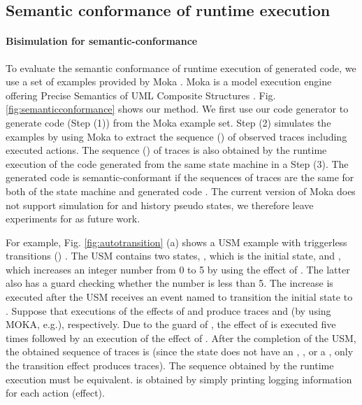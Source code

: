 
\subsection{Semantic conformance of runtime execution}
\label{subsec:exp2}
\paragraph{Bisimulation for semantic-conformance}
To evaluate the semantic conformance of runtime execution of generated code, we use a set of examples provided by Moka \cite{moka}. Moka is a model execution engine offering Precise Semantics of UML Composite Structures \cite{OMG2015}. Fig. \ref{fig:semanticconformance} shows our method. We first use our code generator to generate code (Step (1)) from the Moka example set. Step (2) simulates the examples by using Moka to extract the sequence () of observed traces including executed actions. The sequence () of traces is also obtained by the runtime execution of the code generated from the same state machine in a Step (3). The generated code is semantic-conformant if the sequences of traces are the same for both of the state machine and generated code \cite{Blech2005}. The current version of Moka does not support simulation for  and history pseudo states, we therefore leave experiments for  as future work.

For example, Fig. \ref{fig:autotransition} (a) shows a USM example with triggerless transitions () . 
The USM contains two states, , which is the initial state, and , which increases an integer number from 0 to 5 by using the effect of . The latter also has a guard checking whether the number is less than 5.
The increase is executed after the USM receives an event named  to transition the initial state  to . 
Suppose that executions of the effects of  and  produce traces  and  (by using MOKA, e.g.), respectively. 
Due to the guard of , the effect of  is executed five times followed by an execution of the effect of .
After the completion of the USM, the obtained sequence of traces
is  (since the  state does not have an , , or a , only the transition effect  produces traces). 
The sequence  obtained by the runtime execution %
must be equivalent. 
 is obtained by simply printing logging information for each action (effect).

